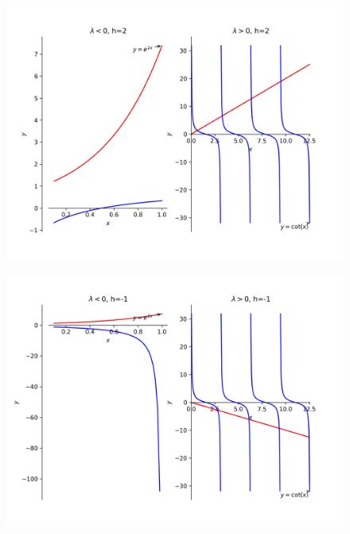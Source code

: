 \documentclass[11pt]{article}
\begin{document}
\begin{figure}
\centerline{\includegraphics{h_2.jpg}}
\end{figure}

\begin{figure}
\centerline{\includegraphics{h_-1.jpg}}
\end{figure}
\end{document}
